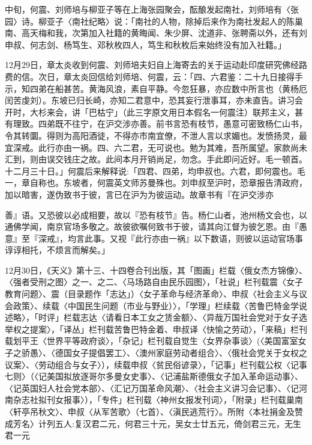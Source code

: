 中旬，何震、刘师培与柳亚子等在上海张园聚会，酝酿发起南社，刘师培有〈张园〉诗。柳亚子〈南社纪略〉说：「南社的人物，除掉后来作为南社发起人的陈巢南、高天梅和我，次第加入社籍的黄晦闻、朱少屏、沈道非、张聘斋以外，还有刘申叔、何志剑、杨笃生、邓秋枚四人，笃生和秋枚后来始终没有加入社籍。」

12月29日，章太炎收到何震、刘师培夫妇自上海寄去的关于运动赴印度研究佛经路费的信。次日，章太炎回信给刘师培、何震，云：「四、六君鉴：二十九日接得手示，知四弟在船甚苦。黄海风浪，素自平静。今忽狂暴，亦应数中所言也（黄杨厄闰苦虔刘）。东坡已归长崎，亦知二君意中，恐其妄行泄事耳，亦未直告。讲习会开时，大杉来会，讲「巴枯宁」（此三字原文用日本假名一何震注）联邦主义，甚有理致。四弟既不往宁，在沪交涉亦善。前书言恐有枝节，愚意可密致杨仁山书，令其转圜。得则为高阳酒徒，不得亦市南宜僚，不泄人言以求媚也。发愤扬灵，最宜深戒。此行亦由一祸。四、六二君，无可说也。勉为其难，吾所属望。家款尚未汇到，则由误交钱庄之故。此间本月开销尚足，勿念。手此即问近好。毛一顿首。十二月三十日。」何震后来解释说:「四君、四弟，均申叔也。六君，即何震也。毛一，章自称也。东坡者，何震英文师苏曼殊也。刘申叔至沪时，恐章报告清政府，加以暗害，遂伪致书于彼，言已在沪为为彼运动。故章书有『在沪交涉亦

\vfill
\begin{BookNotes}
\end{BookNotes}

\noindent 善』语。又恐彼以必成相要，故以『恐有枝节』告。杨仁山者，池州杨文会也，以通佛学闻，南京官场多敬之。故彼欲嘱何致书于彼，请其向江督为彼乞恩。由『愚意』至『深戒』，均言此事。又视『此行亦由一祸』以下数语，则彼以运动官场事谆谆相托，不烦言而解矣。」

12月30日，《天义》第十三、十四卷合刊出版，其「图画」栏载〈俄女杰方锦像〉、〈强者受刑之图〉之一、之二、〈马场路自由民乐园图〉，「社说」栏刊载震〈女子教育问题〉、震（目录题作「志达」）〈女子革命与经济革命〉、申叔〈社会主义与议会政策〉、续载〈中国民生问题（市业与野业）〉，「学理」栏续载〈苦鲁巴特金学说述略〉，「时评」栏载志达〈请看日本工女之赁金额〉、〈异哉万国社会党对于女子选举权之提案〉，「译丛」栏刊载苦鲁巴特金着、申叔译〈快愉之劳动〉，「来稿」栏刊载划平王〈世界平等政府谈〉，「杂记」栏刊载自觉生〈女界杂事谈〉(〈美国富室女子之骄愚〉、〈德国女子提倡罢工〉、〈澳州家庭劳动者组合〉、〈俄社会党关于女权之议案〉、〈劳动组合与女子〉），续载申叔〈贫民俗谚录〉，「记事」栏刊载公权〈记事七则〉（〈记美国拟放逐哥尔多曼女史事〉、〈记浦盐斯德俄女子加入革命运动事〉、〈记英国妇人社会党本部〉、〈汇记万国革命风潮〉、〈社会主义讲习会记事〉、〈记河南杂志社拟刊女报事〉），「专件」栏刊载〈神州女报发刊词〉，「附录」栏刊载巢南〈轩亭吊秋文〉、申叔〈从军苦歌〉（七首）、〈滇民逃荒行〉。所附〈本社捐金及赞成芳名〉计列五人:复汉君二元，何君三十元，吴女士廿五元，倚剑君三元，无生君一元

